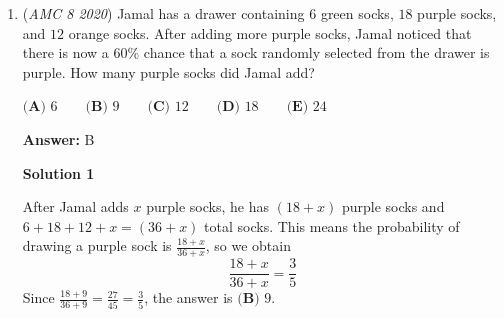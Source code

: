 \begin{enumerate}
 



\textbf{Solution 3 (using answer choices and elimination)}

We can see that the answers $\textbf{(B)}$ to $\textbf{(E)}$ contain a factor of $11$, but there is no such factor of $11$ in $5! \cdot 9!$. The factor 11 is in every answer choice except $\boxed{\textbf{(A) }10}$, so four of the possible answers are eliminated. Therefore, the answer must be $\boxed{\textbf{(A) }10}$.~edited by HW73

 



\textbf{Solution 4}

We notice that $5! \cdot 9! = (5!)^2 \cdot (9 \cdot 8 \cdot 7 \cdot 6).$

 We know that $5! = 120,$ so we have $120(5! \cdot 9 \cdot 8 \cdot 7 \cdot 6) = 12 \cdot N!$

 Isolating $N!$ we have $N! = 10 \cdot 5! \cdot 9 \cdot 8 \cdot 7 \cdot 6 \Rightarrow N! = 10! \Rightarrow N = \boxed{\textbf{(A) }10}.$




\textbf{Solution 5}

Notice that $9!$ is equivalent to $\frac{12!}{12 \cdot 11 \cdot 10}$. In the expression $\frac{12!}{12 \cdot 11 \cdot 10} \cdot 5 \cdot 4 \cdot 3 \cdot 2$, cancel out $12$, $4$, $3$, and $10$, $5$, $2$. The resulting equation is $\frac{12!}{11} = 12 \cdot N!$. The equation gives $12 \cdot 10! = 12 \cdot N!$. Therefore, N = 10, so the answer is $\boxed{(A)10}$.

 


 


	\item (\textit{AMC 8 2020}) Jamal has a drawer containing $6$ green socks, $18$ purple socks, and $12$ orange socks. After adding more purple socks, Jamal noticed that there is now a $60\%$ chance that a sock randomly selected from the drawer is purple. How many purple socks did Jamal add?


 $\textbf{(A) }6 \qquad \textbf{(B) }9 \qquad \textbf{(C) }12 \qquad \textbf{(D) }18 \qquad \textbf{(E) }24$

 \textbf{Answer: }B



\textbf{Solution 1}

After Jamal adds $x$ purple socks, he has $(18+x)$ purple socks and $6+18+12+x=(36+x)$ total socks. This means the probability of drawing a purple sock is $\frac{18+x}{36+x}$, so we obtain 
 \[\frac{18+x}{36+x}=\frac{3}{5}\] Since $\frac{18+9}{36+9}=\frac{27}{45}=\frac{3}{5}$, the answer is $\boxed{\textbf{(B) }9}$.


\end{enumerate}
